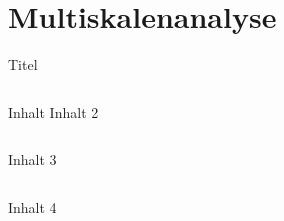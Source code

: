 \section{Multiskalenanalyse}
	
	{
	\begin{frame}{Titel}
		\begin{columns}[T,onlytextwidth]
			Inhalt
			Inhalt 2
		\end{columns}
		Inhalt 3 \pause
		\begin{columns}[c,onlytextwidth]
			\centering
			Inhalt 4
			
			\vspace{15pt}\ \\
		\end{columns}
	\end{frame}}